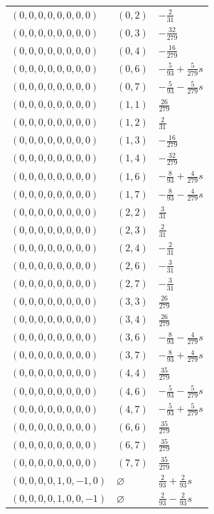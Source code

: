 \begin{longtable}{@{}lll@{}}
$(0,0,0,0,0,0,0,0)$ & $(0,2)$ & $-\frac{2}{31}$\\
$(0,0,0,0,0,0,0,0)$ & $(0,3)$ & $-\frac{32}{279}$\\
$(0,0,0,0,0,0,0,0)$ & $(0,4)$ & $-\frac{16}{279}$\\
$(0,0,0,0,0,0,0,0)$ & $(0,6)$ & $-\frac{5}{93}+\frac{5}{279}s$\\
$(0,0,0,0,0,0,0,0)$ & $(0,7)$ & $-\frac{5}{93}-\frac{5}{279}s$\\
$(0,0,0,0,0,0,0,0)$ & $(1,1)$ & $\frac{26}{279}$\\
$(0,0,0,0,0,0,0,0)$ & $(1,2)$ & $\frac{2}{31}$\\
$(0,0,0,0,0,0,0,0)$ & $(1,3)$ & $-\frac{16}{279}$\\
$(0,0,0,0,0,0,0,0)$ & $(1,4)$ & $-\frac{32}{279}$\\
$(0,0,0,0,0,0,0,0)$ & $(1,6)$ & $-\frac{8}{93}+\frac{4}{279}s$\\
$(0,0,0,0,0,0,0,0)$ & $(1,7)$ & $-\frac{8}{93}-\frac{4}{279}s$\\
$(0,0,0,0,0,0,0,0)$ & $(2,2)$ & $\frac{3}{31}$\\
$(0,0,0,0,0,0,0,0)$ & $(2,3)$ & $\frac{2}{31}$\\
$(0,0,0,0,0,0,0,0)$ & $(2,4)$ & $-\frac{2}{31}$\\
$(0,0,0,0,0,0,0,0)$ & $(2,6)$ & $-\frac{3}{31}$\\
$(0,0,0,0,0,0,0,0)$ & $(2,7)$ & $-\frac{3}{31}$\\
$(0,0,0,0,0,0,0,0)$ & $(3,3)$ & $\frac{26}{279}$\\
$(0,0,0,0,0,0,0,0)$ & $(3,4)$ & $\frac{26}{279}$\\
$(0,0,0,0,0,0,0,0)$ & $(3,6)$ & $-\frac{8}{93}-\frac{4}{279}s$\\
$(0,0,0,0,0,0,0,0)$ & $(3,7)$ & $-\frac{8}{93}+\frac{4}{279}s$\\
$(0,0,0,0,0,0,0,0)$ & $(4,4)$ & $\frac{35}{279}$\\
$(0,0,0,0,0,0,0,0)$ & $(4,6)$ & $-\frac{5}{93}-\frac{5}{279}s$\\
$(0,0,0,0,0,0,0,0)$ & $(4,7)$ & $-\frac{5}{93}+\frac{5}{279}s$\\
$(0,0,0,0,0,0,0,0)$ & $(6,6)$ & $\frac{35}{279}$\\
$(0,0,0,0,0,0,0,0)$ & $(6,7)$ & $\frac{35}{279}$\\
$(0,0,0,0,0,0,0,0)$ & $(7,7)$ & $\frac{35}{279}$\\
$(0,0,0,0,1,0,-1,0)$ & $\varnothing$ & $\frac{2}{93}+\frac{2}{93}s$\\
$(0,0,0,0,1,0,0,-1)$ & $\varnothing$ & $\frac{2}{93}-\frac{2}{93}s$\\

\end{longtable}
